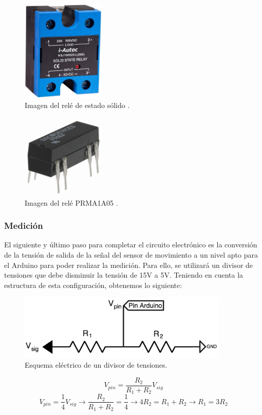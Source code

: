 \begin{figure}[H]
    \centering
    \includegraphics[width=4cm]{FigurasMemoria/SSRrelay.jpeg}
    \caption{Imagen del relé de estado sólido \citep{rs2024ksj}.}
    \label{fig:SSRrelay} %
\end{figure}

\begin{figure}[H]
    \centering
    \includegraphics[width=4cm]{FigurasMemoria/PRMArelay.jpeg}
    \caption{Imagen del relé PRMA1A05 \citep{coto2024prma1a05b}.}
    \label{fig:PRMArelay} %
\end{figure}

\subsubsection*{Medición}

El siguiente y último paso para completar el circuito electrónico es la conversión de la tensión de salida de la señal del sensor de movimiento a un nivel apto para el Arduino para poder realizar la medición. Para ello, se utilizará un divisor de tensiones que debe disminuir la tensión de 15V a 5V. Teniendo en cuenta la estructura de esta configuración, obtenemos lo siguiente:

\begin{figure}[H]
    \centering
    \includegraphics[width=10cm]{FigurasMemoria/divisorTensiones.png}
    \caption{Esquema eléctrico de un divisor de tensiones.}
    \label{fig:divisorTensiones} %
\end{figure}
\[
V_{pin}=\frac{R_2}{R_1+R_2}V_{sig}
\]
\[
V_{pin}=\frac{1}{4}V_{sig}\to \frac{R_2}{R_1+R_2}=\frac{1}{4}\to 4R_2=R_1+R_2\to R_1=3R_2
\]

